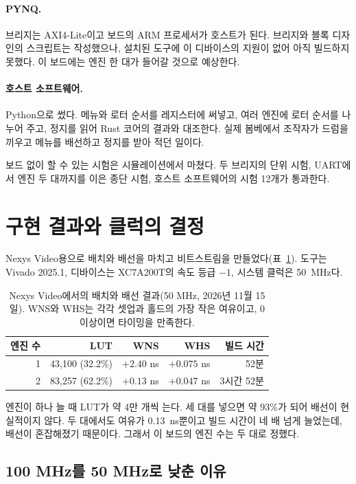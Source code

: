 \paragraph{PYNQ.} 브리지는 AXI4-Lite이고 보드의 ARM 프로세서가 호스트가 된다. 브리지와 블록 디자인의
스크립트는 작성했으나, 설치된 도구에 이 디바이스의 지원이 없어 아직 빌드하지 못했다. 이 보드에는 엔진 한
대가 들어갈 것으로 예상한다.

\paragraph{호스트 소프트웨어.} Python으로 썼다. 메뉴와 로터 순서를 레지스터에 써넣고, 여러 엔진에 로터 순서를
나누어 주고, 정지를 읽어 Rust 코어의 결과와 대조한다. 실제 봄베에서 조작자가 드럼을 끼우고 메뉴를 배선하고
정지를 받아 적던 일이다.

보드 없이 할 수 있는 시험은 시뮬레이션에서 마쳤다. 두 브리지의 단위 시험, UART에서 엔진 두 대까지를 이은
종단 시험, 호스트 소프트웨어의 시험 12개가 통과한다.

\section{구현 결과와 클럭의 결정}\label{sec:fpga-results}

Nexys Video용으로 배치와 배선을 마치고 비트스트림을 만들었다(표~\ref{tab:fpga-impl}). 도구는 Vivado 2025.1,
디바이스는 XC7A200T의 속도 등급 $-1$, 시스템 클럭은 50~MHz다.

\begin{table}[ht]
\centering
\caption{Nexys Video에서의 배치와 배선 결과(50 MHz, 2026년 11월 15일). WNS와 WHS는 각각 셋업과 홀드의 가장
작은 여유이고, 0 이상이면 타이밍을 만족한다.}
\label{tab:fpga-impl}
\begin{tabular}{rrrrr}
\toprule
엔진 수 & LUT & WNS & WHS & 빌드 시간 \\
\midrule
1 & 43,100 (32.2\%) & $+2.40$ ns & $+0.075$ ns & 52분 \\
2 & 83,257 (62.2\%) & $+0.13$ ns & $+0.047$ ns & 3시간 52분 \\
\bottomrule
\end{tabular}
\end{table}

엔진이 하나 늘 때 LUT가 약 4만 개씩 는다. 세 대를 넣으면 약 93\%가 되어 배선이 현실적이지 않다. 두 대에서도
여유가 0.13~ns뿐이고 빌드 시간이 네 배 넘게 늘었는데, 배선이 혼잡해졌기 때문이다. 그래서 이 보드의 엔진 수는
두 대로 정했다.

\subsection{100 MHz를 50 MHz로 낮춘 이유}

